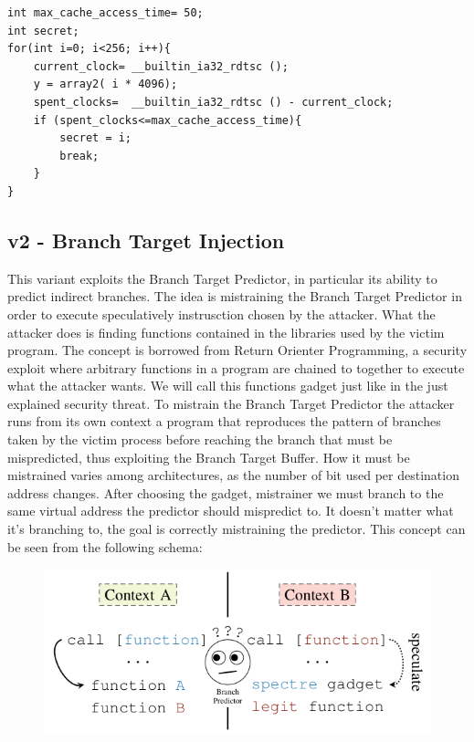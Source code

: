 \begin{verbatim}
int max_cache_access_time= 50;
int secret;
for(int i=0; i<256; i++){
	current_clock= __builtin_ia32_rdtsc ();
	y = array2( i * 4096);
	spent_clocks=  __builtin_ia32_rdtsc () - current_clock;
	if (spent_clocks<=max_cache_access_time){
		secret = i;
		break;
	}
}
\end{verbatim}

\subsection{v2 - Branch Target Injection}
This variant exploits the Branch Target Predictor, in particular its ability to predict indirect branches.
The idea is mistraining the Branch Target Predictor in order to execute speculatively instrusction chosen by the attacker.
What the attacker does is finding functions contained in the libraries used by the victim program.
The concept is borrowed from Return Orienter Programming, a security exploit where arbitrary functions in a program are chained to together to execute what the attacker wants.
We will call this functions gadget just like in the just explained security threat.
To mistrain the Branch Target Predictor the attacker runs from its own context a program that reproduces the pattern of branches taken by the victim process before reaching the branch that must be mispredicted, thus exploiting the Branch Target Buffer.
How it must be mistrained varies among architectures, as the number of bit used per destination address changes.
After choosing the gadget, mistrainer we must branch to the same virtual address the predictor should mispredict to.
It doesn't matter what it's branching to, the goal is correctly mistraining the predictor.
This concept can be seen from the following schema:

\begin{figure}[!h]
    \includegraphics[scale=0.4]{img/sv2-mistraining.png}
    \caption{}
\end{figure}


